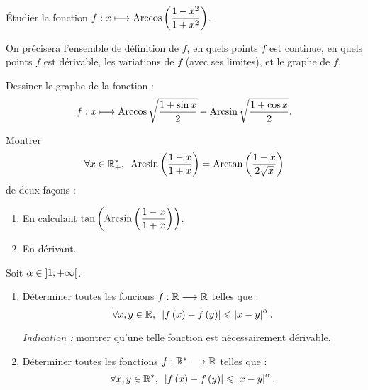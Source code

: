 \begin{exo}[Exercice 6]
Étudier la fonction \(f:x\longmapsto\operatorname{Arccos}\left(\dfrac{1-x^2}{1+x^2}\right)\).

On précisera l'ensemble de définition de \(f\), en quels points \(f\) est continue, en quels points \(f\) est dérivable, les variations de \(f\) (avec ses limites), et le graphe de \(f\).
\end{exo}

\begin{corr}
\end{corr}

\begin{exo}[Exercice 7]
Dessiner le graphe de la fonction : \[f:x\longmapsto\operatorname{Arccos}\sqrt{\dfrac{1+\sin x}{2}}-\operatorname{Arcsin}\sqrt{\dfrac{1+\cos x}{2}}.\]
\end{exo}

\begin{corr}
\end{corr}

\begin{exo}[Exercice 8]
Montrer \[\quantifs{\forall x\in\Rps}\Arcsin\paren{\dfrac{1-x}{1+x}}=\Arctan\paren{\dfrac{1-x}{2\sqrt{x}}}\] de deux façons :

\begin{enumerate}
\item En calculant \(\tan\left(\operatorname{Arcsin}\left(\dfrac{1-x}{1+x}\right)\right)\). \\

\item En dérivant.
\end{enumerate}
\end{exo}

\begin{corr}
\end{corr}

\begin{exo}[Exercice 9]
Soit \(\alpha\in\left]1;+\infty\right[\).

\begin{enumerate}
\item Déterminer toutes les foncions \(f:\mathbb{R}\longrightarrow\mathbb{R}\) telles que : \[\quantifs{\forall x,y\in\R}\abs{f\paren{x}-f\paren{y}}\leq\abs{x-y}^{\alpha}.\]

\textit{Indication :} montrer qu'une telle fonction est nécessairement dérivable. \\

\item Déterminer toutes les fonctions \(f:\mathbb{R}^*\longrightarrow\mathbb{R}\) telles que : \[\quantifs{\forall x,y\in\Rs}\abs{f\paren{x}-f\paren{y}}\leq\abs{x-y}^{\alpha}.\]
\end{enumerate}
\end{exo}


